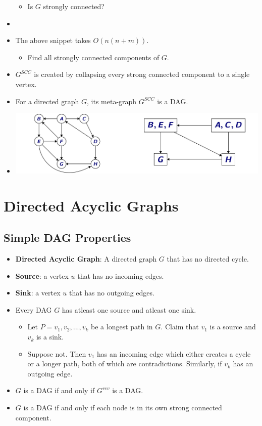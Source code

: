 \documentclass[12pt]{article}
\begin{document}
\begin{itemize}
\begin{itemize}
        \item Is $G$ strongly connected?
    \end{itemize}
    \item[] 
    \item The above snippet takes $O(n(n + m))$.
    \begin{itemize}
        \item Find all strongly connected components of $G$.
    \end{itemize}
    \item $G^{SCC}$ is created by collapsing every strong connected component to a single vertex.
    \item For a directed graph $G$, its meta-graph $G^{SCC}$ is a DAG.
    \item[] \includegraphics[width=\textwidth]{images/scc.jpg}
\end{itemize}

\section{Directed Acyclic Graphs}

\subsection{Simple DAG Properties}
\begin{itemize}
    \item \textbf{Directed Acyclic Graph}: A directed graph $G$ that has no directed cycle.
    \item \textbf{Source}: a vertex $u$ that has no incoming edges.
    \item \textbf{Sink}: a vertex $u$ that has no outgoing edges.
    \item Every DAG $G$ has atleast one source and atleast one sink.
    \begin{itemize}
        \item Let $P = v_1, v_2, ..., v_k$ be a longest path in $G$. Claim that $v_1$ is a source and $v_k$ is a sink.
        \item Suppose not. Then $v_1$ has an incoming edge which either creates a cycle or a longer path, both of which are contradictions. Similarly, if $v_k$ has an outgoing edge.
    \end{itemize}
    \item $G$ is a DAG if and only if $G^{rev}$ is a DAG.
    \item $G$ is a DAG if and only if each node is in its own strong connected component.
\end{itemize}
\end{document}
